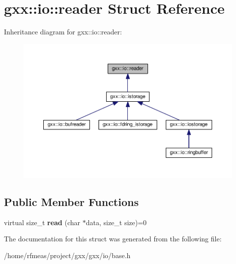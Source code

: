 \hypertarget{structgxx_1_1io_1_1reader}{}\section{gxx\+:\+:io\+:\+:reader Struct Reference}
\label{structgxx_1_1io_1_1reader}


Inheritance diagram for gxx\+:\+:io\+:\+:reader\+:
\nopagebreak
\begin{figure}[H]
\begin{center}
\leavevmode
\includegraphics[width=350pt]{structgxx_1_1io_1_1reader__inherit__graph}
\end{center}
\end{figure}
\subsection*{Public Member Functions}
\begin{DoxyCompactItemize}
\item 
virtual size\+\_\+t {\bfseries read} (char $\ast$data, size\+\_\+t size)=0\hypertarget{structgxx_1_1io_1_1reader_a71c152336f1d1c27675b069da57bd5dd}{}\label{structgxx_1_1io_1_1reader_a71c152336f1d1c27675b069da57bd5dd}

\end{DoxyCompactItemize}


The documentation for this struct was generated from the following file\+:\begin{DoxyCompactItemize}
\item 
/home/rfmeas/project/gxx/gxx/io/base.\+h\end{DoxyCompactItemize}
